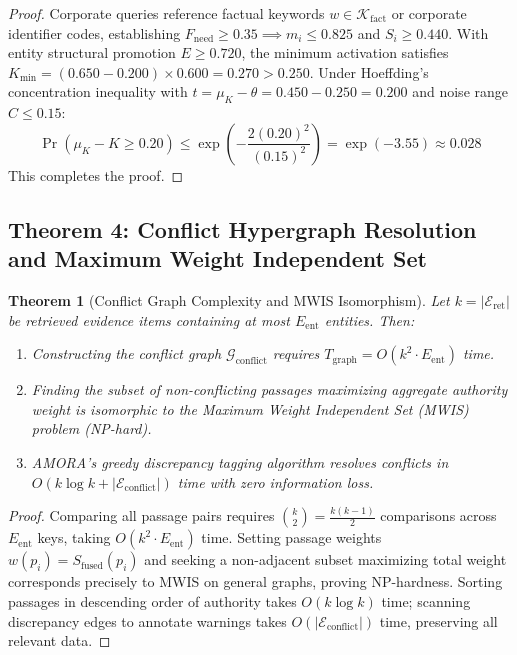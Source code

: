 \documentclass[journal,10pt,twocolumn]{IEEEtran}
\newtheorem{theorem}{Theorem}
\begin{document}
\begin{proof}
Corporate queries reference factual keywords $w \in \mathcal{K}_{\text{fact}}$ or corporate identifier codes, establishing $F_{\text{need}} \ge 0.35 \implies m_i \le 0.825$ and $S_i \ge 0.440$. With entity structural promotion $E \ge 0.720$, the minimum activation satisfies $K_{\text{min}} = (0.650 - 0.200) \times 0.600 = 0.270 > 0.250$. Under Hoeffding's concentration inequality with $t = \mu_K - \theta = 0.450 - 0.250 = 0.200$ and noise range $C \le 0.15$:
\begin{equation}
    \Pr(\mu_K - K \ge 0.20) \le \exp\left( - \frac{2 (0.20)^2}{(0.15)^2} \right) = \exp(-3.55) \approx 0.028
\end{equation}
This completes the proof.
\end{proof}

\subsection{Theorem 4: Conflict Hypergraph Resolution and Maximum Weight Independent Set}
\label{subsec:proof_conflict}

\begin{theorem}[Conflict Graph Complexity and MWIS Isomorphism]
Let $k = |\mathcal{E}_{\text{ret}}|$ be retrieved evidence items containing at most $E_{\text{ent}}$ entities. Then:
\begin{enumerate}
    \item Constructing the conflict graph $\mathcal{G}_{\text{conflict}}$ requires $T_{\text{graph}} = O(k^2 \cdot E_{\text{ent}})$ time.
    \item Finding the subset of non-conflicting passages maximizing aggregate authority weight is isomorphic to the Maximum Weight Independent Set (MWIS) problem (NP-hard).
    \item AMORA's greedy discrepancy tagging algorithm resolves conflicts in $O(k \log k + |\mathcal{E}_{\text{conflict}}|)$ time with zero information loss.
\end{enumerate}
\end{theorem}

\begin{proof}
Comparing all passage pairs requires $\binom{k}{2} = \frac{k(k-1)}{2}$ comparisons across $E_{\text{ent}}$ keys, taking $O(k^2 \cdot E_{\text{ent}})$ time. Setting passage weights $w(p_i) = S_{\text{fused}}(p_i)$ and seeking a non-adjacent subset maximizing total weight corresponds precisely to MWIS on general graphs, proving NP-hardness. Sorting passages in descending order of authority takes $O(k \log k)$ time; scanning discrepancy edges to annotate warnings takes $O(|\mathcal{E}_{\text{conflict}}|)$ time, preserving all relevant data.
\end{proof}
\end{document}
